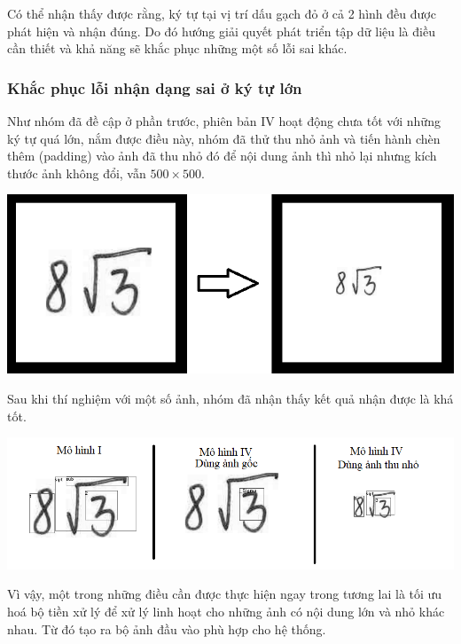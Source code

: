 \documentclass[a4paper,12pt]{article}
\begin{document}
	Có thể nhận thấy được rằng, ký tự tại vị trí dấu gạch đỏ ở cả 2 hình đều được phát hiện và nhận đúng. Do đó hướng giải quyết phát triển tập dữ liệu là điều cần thiết và khả năng sẽ khắc phục những một số lỗi sai khác. 
	\subsubsection{Khắc phục lỗi nhận dạng sai ở ký tự lớn}
	
	Như nhóm đã đề cập ở phần trước, phiên bản IV hoạt động chưa tốt với những ký tự quá lớn, nắm được điều này, nhóm đã thử thu nhỏ ảnh và tiến hành chèn thêm (padding) vào ảnh đã thu nhỏ đó để nội dung ảnh thì nhỏ lại nhưng kích thước ảnh không đổi, vẫn $500 \times 500$.
	
	\begin{center}
		\centering
		\includegraphics[width=0.775\linewidth]{ensmall.png}
		\vspace{0.5cm}
		
	\end{center}
	
	Sau khi thí nghiệm với một số ảnh, nhóm đã nhận thấy kết quả nhận được là khá tốt.
	
	\begin{center}
		\centering
		\includegraphics[width=0.875\linewidth]{compare_future.png}
		\vspace{0.5cm}
		
	\end{center}
	Vì vậy, một trong những điều cần được thực hiện ngay trong tương lai là tối ưu hoá bộ tiền xử lý để xử lý linh hoạt cho những ảnh có nội dung lớn và nhỏ khác nhau. Từ đó tạo ra bộ ảnh đầu vào phù hợp cho hệ thống.
	
\end{document}
